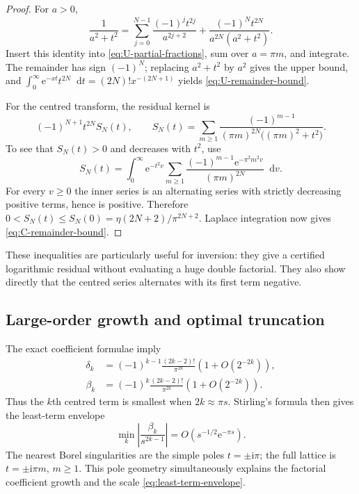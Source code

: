 \documentclass[11pt,a4paper,oneside]{article}
\theoremstyle{plain}
\theoremstyle{definition}
\theoremstyle{remark}
\newcommand{\e}{\mathrm e}
\newcommand{\dd}{\mathop{}\!\mathrm d}
\newcommand{\ii}{\mathrm i}
\newcommand{\etaD}{\eta}
\begin{document}
\begin{proof}
For $a>0$,
\begin{equation}
 \frac1{a^2+t^2}
 =\sum_{j=0}^{N-1}\frac{(-1)^jt^{2j}}{a^{2j+2}}
 +\frac{(-1)^Nt^{2N}}{a^{2N}(a^2+t^2)}.
 \label{eq:partial-fraction-remainder}
\end{equation}
Insert this identity into \cref{eq:U-partial-fractions}, sum over
$a=\pi m$, and integrate.  The remainder has sign $(-1)^N$; replacing
$a^2+t^2$ by $a^2$ gives the upper bound, and
$\int_0^\infty\e^{-xt}t^{2N}\dd t=(2N)!x^{-(2N+1)}$ yields
\cref{eq:U-remainder-bound}.

For the centred transform, the residual kernel is
\[
 (-1)^{N+1}t^{2N}S_N(t),\qquad
 S_N(t)=\sum_{m\ge1}\frac{(-1)^{m-1}}
 { (\pi m)^{2N}\bigl((\pi m)^2+t^2\bigr)}.
\]
To see that $S_N(t)>0$ and decreases with $t^2$, use
\[
 S_N(t)=\int_0^\infty\e^{-t^2v}
 \sum_{m\ge1}\frac{(-1)^{m-1}\e^{-\pi^2m^2v}}{(\pi m)^{2N}}\dd v.
\]
For every $v\ge0$ the inner series is an alternating series with strictly
decreasing positive terms, hence is positive.  Therefore
$0<S_N(t)\le S_N(0)=\etaD(2N+2)/\pi^{2N+2}$.  Laplace integration now gives
\cref{eq:C-remainder-bound}.
\end{proof}

These inequalities are particularly useful for inversion: they give a
certified logarithmic residual without evaluating a huge double factorial.
They also show directly that the centred series alternates with its first term
negative.

\subsection{Large-order growth and optimal truncation}

The exact coefficient formulae imply
\begin{align}
 \delta_k&=(-1)^{k-1}\frac{(2k-2)!}{\pi^{2k}}
 \left(1+O(2^{-2k})\right),
 \label{eq:delta-large-order}\\
 \beta_k&=(-1)^k\frac{(2k-2)!}{\pi^{2k}}
 \left(1+O(2^{-2k})\right).
 \label{eq:beta-large-order}
\end{align}
Thus the $k$th centred term is smallest when
$2k\approx\pi s$.  Stirling's formula then gives the least-term envelope
\begin{equation}
 \min_k\left|\frac{\beta_k}{s^{2k-1}}\right|
 =O\!\left(s^{-1/2}\e^{-\pi s}\right).
 \label{eq:least-term-envelope}
\end{equation}
The nearest Borel singularities are the simple poles $t=\pm\ii\pi$; the full
lattice is $t=\pm\ii\pi m$, $m\ge1$.  This pole geometry simultaneously
explains the factorial coefficient growth and the scale
\cref{eq:least-term-envelope}.
\end{document}
